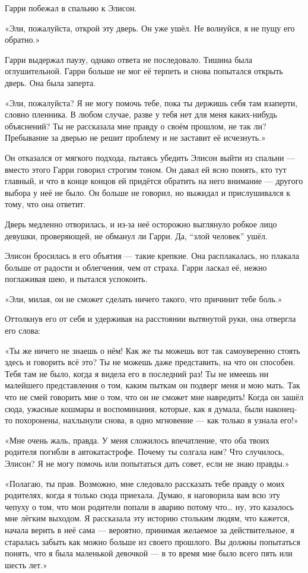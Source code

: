 \documentclass[a5paper, 9pt,
final, openany, twoside=true]{memoir}
\begin{document}
Гарри побежал в спальню к Элисон.

«Эли, пожалуйста, открой эту дверь. Он уже ушёл. Не волнуйся, я не пущу его обратно.»

Гарри выдержал паузу, однако ответа не последовало. Тишина была оглушительной. Гарри больше не мог её терпеть и снова попытался открыть дверь. Она была заперта.

«Эли, пожалуйста? Я не могу помочь тебе, пока ты держишь себя там взаперти, словно пленника. В любом случае, разве у тебя нет для меня каких-нибудь объяснений? Ты не рассказала мне правду о своём прошлом, не так ли? Пребывание за дверью не решит проблему и не заставит её исчезнуть.»

Он отказался от мягкого подхода, пытаясь убедить Элисон выйти из спальни — вместо этого Гарри говорил строгим тоном. Он давал ей ясно понять, кто тут главный, и что в конце концов ей придётся обратить на него внимание — другого выбора у неё не было. Он больше не говорил, но выжидал и прислушивался к тому, что она ответит.

Дверь медленно отворилась, и из-за неё осторожно выглянуло робкое лицо девушки, проверяющей, не обманул ли Гарри. Да, ``злой человек'' ушёл.

Элисон бросилась в его объятия — такие крепкие. Она расплакалась, но плакала больше от радости и облегчения, чем от страха. Гарри ласкал её, нежно поглаживая шею, и пытался успокоить.

«Эли, милая, он не сможет сделать ничего такого, что причинит тебе боль.»

Оттолкнув его от себя и удерживая на расстоянии вытянутой руки, она отвергла его слова:

«Ты же ничего не знаешь о нём! Как же ты можешь вот так самоуверенно стоять здесь и говорить всё это? Ты не можешь даже представить, на что он способен. Тебя там не было, когда я видела его в последний раз! Ты не имеешь ни малейшего представления о том, каким пыткам он подверг меня и мою мать. Так что не смей говорить мне о том, что он не сможет мне навредить! Когда он зашёл сюда, ужасные кошмары и воспоминания, которые, как я думала, были наконец-то похоронены, нахлынули снова, в одно мгновение — как только я узнала его!»

«Мне очень жаль, правда. У меня сложилось впечатление, что оба твоих родителя погибли в автокатастрофе. Почему ты солгала нам? Что случилось, Элисон? Я не могу помочь или попытаться дать совет, если не знаю правды.»

«Полагаю, ты прав. Возможно, мне следовало рассказать тебе правду о моих родителях, когда я только сюда приехала. Думаю, я наговорила вам всю эту чепуху о том, что мои родители попали в аварию потому что… ну, это казалось мне лёгким выходом. Я рассказала эту историю стольким людям, что кажется, начала верить в неё сама — вероятно, принимая желаемое за действительное, я старалась забыть как можно больше из своего прошлого. Вы должны попытаться понять, что я была маленькой девочкой — в то время мне было всего пять или шесть лет.»
\end{document}
